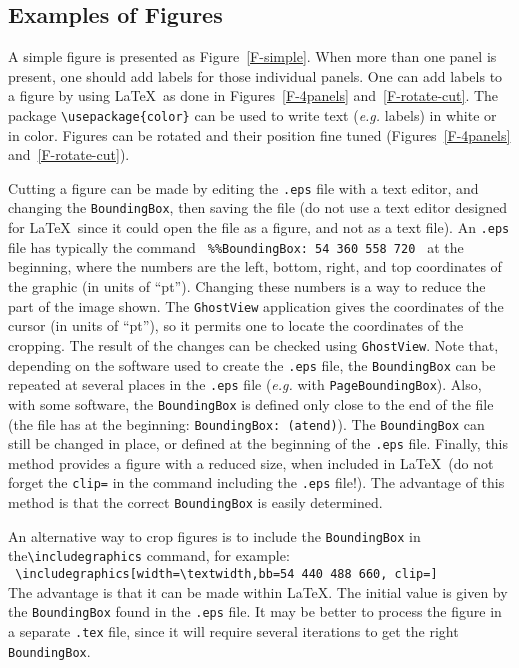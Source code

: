 \documentclass[namedreferences]{solarphysics}
\begin{document}
\begin{article}
{\subsection{Examples of Figures} %
  \label{S-figures}
 A simple figure is presented as Figure~\ref{F-simple}. When more
than one panel is present, one should add labels for those individual panels.
One can add labels to a figure by using \LaTeX\ as done
in Figures~\ref{F-4panels} and~\ref{F-rotate-cut}. 
The package \verb+\usepackage{color}+
can be used to write text ({\it e.g.} labels) in white or in color. 
Figures can be rotated and their position fine tuned 
(Figures~\ref{F-4panels} and~\ref{F-rotate-cut}).

  Cutting a figure can be made by editing the \texttt{.eps} 
file with a text editor, and changing the \texttt{BoundingBox}, 
then saving the file (do not use a text editor designed for \LaTeX\ since 
it could open the file as a figure, and not as a text file).
An \texttt{.eps} file has typically the command
\verb+ %%BoundingBox: 54 360 558 720 + 
at the beginning, where the numbers are the left, bottom, right, and top
coordinates of the graphic (in units of ``pt'').  
Changing these numbers is a way to reduce the part of the image shown. 
The \texttt{GhostView} application gives the coordinates
of the cursor (in units of ``pt''), so it permits one to locate the 
coordinates of the cropping. 
The result of the changes can be checked using \texttt{GhostView}. 
 Note that, depending on the software used to create the \texttt{.eps} file, 
the \texttt{BoundingBox} can be repeated at several places in the
\texttt{.eps} file ({\it e.g.} with \texttt{PageBoundingBox}). 
Also, with some software,
the \texttt{BoundingBox} is defined only close to the end of the file
(the file has at the beginning: \texttt{BoundingBox: (atend)}).
The \texttt{BoundingBox} can still be changed
in place, or defined at the beginning of the \texttt{.eps} file. 
   Finally, this method provides a figure with a reduced size, when
included in \LaTeX\ (do not forget the \texttt{clip=} 
in the command including the \texttt{.eps} file!).     
The advantage of this method is that the correct \texttt{BoundingBox}
is easily determined.

   An alternative way to crop figures is to include the \texttt{BoundingBox}
in the\linebreak \verb+\includegraphics+ command, for example:\\
\verb+ \includegraphics[width=\textwidth,bb=54 440 488 660, clip=]+ \\
  The advantage
is that it can be made within \LaTeX . The initial value is given
by the \texttt{BoundingBox} found in the \texttt{.eps} file.
It may be better to process the
figure in a separate \texttt{.tex} file, since it will require several 
iterations to get the right \texttt{BoundingBox}.
   
}
\end{article}
\end{document}
